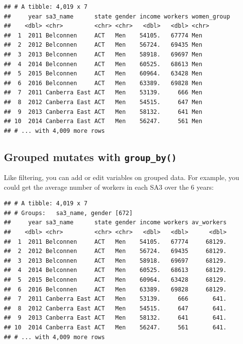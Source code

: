 \documentclass[]{book}
\newenvironment{Shaded}{\begin{snugshade}}{\end{snugshade}}
\newcommand{\DataTypeTok}[1]{\textcolor[rgb]{0.13,0.29,0.53}{#1}}
\newcommand{\KeywordTok}[1]{\textcolor[rgb]{0.13,0.29,0.53}{\textbf{#1}}}
\newcommand{\NormalTok}[1]{#1}
\newcommand{\OperatorTok}[1]{\textcolor[rgb]{0.81,0.36,0.00}{\textbf{#1}}}
\newcommand{\StringTok}[1]{\textcolor[rgb]{0.31,0.60,0.02}{#1}}
\begin{document}
\begin{verbatim}
## # A tibble: 4,019 x 7
##     year sa3_name      state gender income workers women_group
##    <dbl> <chr>         <chr> <chr>   <dbl>   <dbl> <chr>      
##  1  2011 Belconnen     ACT   Men    54105.   67774 Men        
##  2  2012 Belconnen     ACT   Men    56724.   69435 Men        
##  3  2013 Belconnen     ACT   Men    58918.   69697 Men        
##  4  2014 Belconnen     ACT   Men    60525.   68613 Men        
##  5  2015 Belconnen     ACT   Men    60964.   63428 Men        
##  6  2016 Belconnen     ACT   Men    63389.   69828 Men        
##  7  2011 Canberra East ACT   Men    53139.     666 Men        
##  8  2012 Canberra East ACT   Men    54515.     647 Men        
##  9  2013 Canberra East ACT   Men    58132.     641 Men        
## 10  2014 Canberra East ACT   Men    56247.     561 Men        
## # ... with 4,009 more rows
\end{verbatim}

\hypertarget{grouped-mutates-with-group_by}{%
\subsection{\texorpdfstring{Grouped mutates with \texttt{group\_by()}}{Grouped mutates with group\_by()}}\label{grouped-mutates-with-group_by}}

Like filtering, you can add or edit variables on grouped data. For example, you could get the average number of workers in each SA3 over the 6 years:

\begin{Shaded}
\end{Shaded}

\begin{verbatim}
## # A tibble: 4,019 x 7
## # Groups:   sa3_name, gender [672]
##     year sa3_name      state gender income workers av_workers
##    <dbl> <chr>         <chr> <chr>   <dbl>   <dbl>      <dbl>
##  1  2011 Belconnen     ACT   Men    54105.   67774     68129.
##  2  2012 Belconnen     ACT   Men    56724.   69435     68129.
##  3  2013 Belconnen     ACT   Men    58918.   69697     68129.
##  4  2014 Belconnen     ACT   Men    60525.   68613     68129.
##  5  2015 Belconnen     ACT   Men    60964.   63428     68129.
##  6  2016 Belconnen     ACT   Men    63389.   69828     68129.
##  7  2011 Canberra East ACT   Men    53139.     666       641.
##  8  2012 Canberra East ACT   Men    54515.     647       641.
##  9  2013 Canberra East ACT   Men    58132.     641       641.
## 10  2014 Canberra East ACT   Men    56247.     561       641.
## # ... with 4,009 more rows
\end{verbatim}
\end{document}
